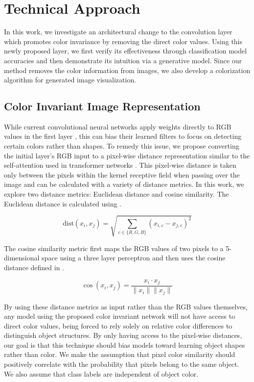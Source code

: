 \documentclass[10pt,twocolumn,letterpaper]{article}
\begin{document}
\section{Technical Approach}
In this work, we investigate an architectural change to the convolution layer which promotes color invariance by removing the direct color values. Using this newly proposed layer, we first verify its effectiveness through classification model accuracies and then demonstrate its intuition via a generative model. Since our method removes the color information from images, we also develop a colorization algorithm for generated image visualization.

\subsection{Color Invariant Image Representation}
\label{colorInvariant}
While current convolutional neural networks apply weights directly to RGB values in the first layer \cite{LeCun98}, this can bias their learned filters to focus on detecting certain colors rather than shapes. To remedy this issue, we propose converting the initial layer's RGB input to a pixel-wise distance representation similar to the self-attention used in transformer networks \cite{Vaswani17}. This pixel-wise distance is taken only between the pixels within the kernel receptive field when passing over the image and can be calculated with a variety of distance metrics. In this work, we explore two distance metrics: Euclidean distance and cosine similarity. The Euclidean distance is calculated using .

\begin{equation}
    \text{dist}(x_i, x_j) = \sqrt{\sum_{c \in \{R, G, B\}}(x_{i, c} - x_{j, c})^2}
    \label{dist}
\end{equation}

The cosine similarity metric first maps the RGB values of two pixels to a 5-dimensional space using a three layer perceptron and then uses the cosine distance defined in .

\begin{equation}
    \cos(x_i, x_j) = \frac{x_i \cdot x_j}{\|x_i \|\|x_j \|}
    \label{cos}
\end{equation}

By using these distance metrics as input rather than the RGB values themselves, any model using the proposed color invariant network will not have access to direct color values, being forced to rely solely on relative color differences to distinguish object structures. By only having access to the pixel-wise distances, our goal is that this technique should bias models toward learning object shapes rather than color. We make the assumption that pixel color similarity should positively correlate with the probability that pixels belong to the same object. We also assume that class labels are independent of object color.
\end{document}
